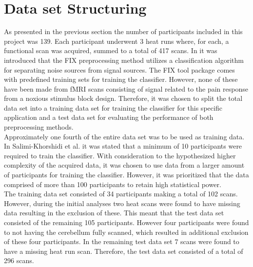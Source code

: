 \section{Data set Structuring}

As presented in the previous section the number of participants included in this project was 139. Each participant underwent 3 heat runs where, for each, a functional scan was acquired, summed to a total of 417 scans. In  it was introduced that the FIX preprocessing method utilizes a classification algorithm for separating noise sources from signal sources. The FIX tool package comes with predefined training sets for training the classifier. However, none of these have been made from fMRI scans consisting of signal related to the pain response from a noxious stimulus block design. Therefore, it was chosen to split the total data set into a training data set for training the classifier for this specific application and a test data set for evaluating the performance of both preprocessing methods. \\
Approximately one fourth of the entire data set was to be used as training data. In Salimi-Khorshidi et al. \cite{Salimi-Khorshidi2014} it was stated that a minimum of 10 participants were required to train the classifier. With consideration to the hypothesized higher complexity of the acquired data, it was chosen to use data from a larger amount of participants for training the classifier. However, it was prioritized that the data comprised of more than 100 participants to retain high statistical power.\\
The training data set consisted of 34 participants making a total of 102 scans. However, during the initial analyses two heat scans were found to have missing data resulting in the exclusion of these. This meant that the test data set consisted of the remaining 105 participants. However four participants were found to not having the cerebellum fully scanned, which resulted in additional exclusion of these four participants. In the remaining test data set 7 scans were found to have a missing heat run scan.  Therefore, the test data set consisted of a total of 296 scans.  \\

%
